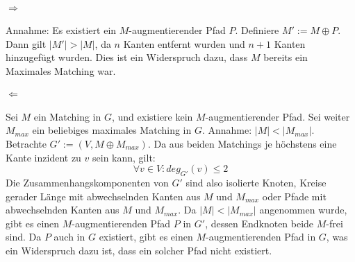 \documentclass[10pt,a4paper]{article}
\begin{document}
\paragraph{$\Rightarrow$}
Annahme: Es existiert ein $M$-augmentierender Pfad $P$.
Definiere $M' := M \oplus P$. Dann gilt $|M'| > |M|$, da $n$ Kanten entfernt wurden und $n+1$ Kanten hinzugef\"ugt wurden.
Dies ist ein Widerspruch dazu, dass $M$ bereits ein Maximales Matching war.

\paragraph{$\Leftarrow$}
Sei $M$ ein Matching in $G$, und existiere kein $M$-augmentierender Pfad. Sei weiter $M_{max}$ ein beliebiges maximales Matching in $G$. Annahme: $|M| < |M_{max}|$.
Betrachte $G' := (V, M \oplus M_{max})$. Da aus beiden Matchings je h\"ochstens eine Kante inzident zu $v$ sein kann, gilt:
\begin{equation*}
\forall v \in V : deg_{G'}(v) \leq 2
\end{equation*}
Die Zusammenhangskomponenten von $G'$ sind also isolierte Knoten, Kreise gerader L\"ange mit abwechselnden Kanten aus $M$ und $M_{max}$ oder Pfade mit abwechselnden Kanten aus $M$ und $M_{max}$.
Da $|M| < |M_{max}|$ angenommen wurde, gibt es einen $M$-augmentierenden Pfad $P$ in $G'$, dessen Endknoten beide $M$-frei sind. Da $P$ auch in $G$ existiert, gibt es einen $M$-augmentierenden Pfad in $G$, was ein Widerspruch dazu ist, dass ein solcher Pfad nicht existiert.
\end{document}
